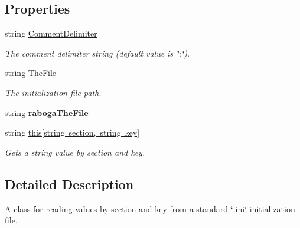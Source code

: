 \subsection*{Properties}
\begin{DoxyCompactItemize}
\item 
string \mbox{\hyperlink{classpic_library_1_1_i_n_ifile_a9e3a9f435c8cacebcd9ccab92bd66457}{Comment\+Delimiter}}
\begin{DoxyCompactList}\small\item\em The comment delimiter string (default value is \char`\"{};\char`\"{}). \end{DoxyCompactList}\item 
string \mbox{\hyperlink{classpic_library_1_1_i_n_ifile_a2fbe7b6c7423b9740f6ec3747a2eecf1}{The\+File}}
\begin{DoxyCompactList}\small\item\em The initialization file path. \end{DoxyCompactList}\item 
\mbox{\label{classpic_library_1_1_i_n_ifile_a9d4528ac108889e3f86d53b05c6ce8ff}} 
string {\bfseries raboga\+The\+File}
\item 
string \mbox{\hyperlink{classpic_library_1_1_i_n_ifile_aec4861d4b2069527b6ac5da73e142a87}{this\mbox{[}string section, string key\mbox{]}}}
\begin{DoxyCompactList}\small\item\em Gets a string value by section and key. \end{DoxyCompactList}\end{DoxyCompactItemize}


\subsection{Detailed Description}
A class for reading values by section and key from a standard \char`\"{}.\+ini\char`\"{} initialization file. 

